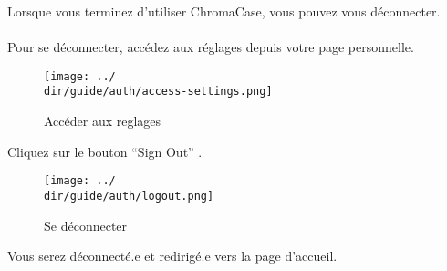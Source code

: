 Lorsque vous terminez d’utiliser ChromaCase, vous pouvez vous déconnecter.
\\\\
Pour se déconnecter, accédez aux réglages depuis votre page personnelle.

\begin{figure}[H]
	\texttt{[image: ../\\dir/guide/auth/access-settings.png]}
	\caption{Accéder aux reglages}
\end{figure}

Cliquez sur le bouton “Sign Out” .

\begin{figure}[H]
	\texttt{[image: ../\\dir/guide/auth/logout.png]}
	\caption{Se déconnecter}
\end{figure}

Vous serez déconnecté.e et redirigé.e vers la page d’accueil.